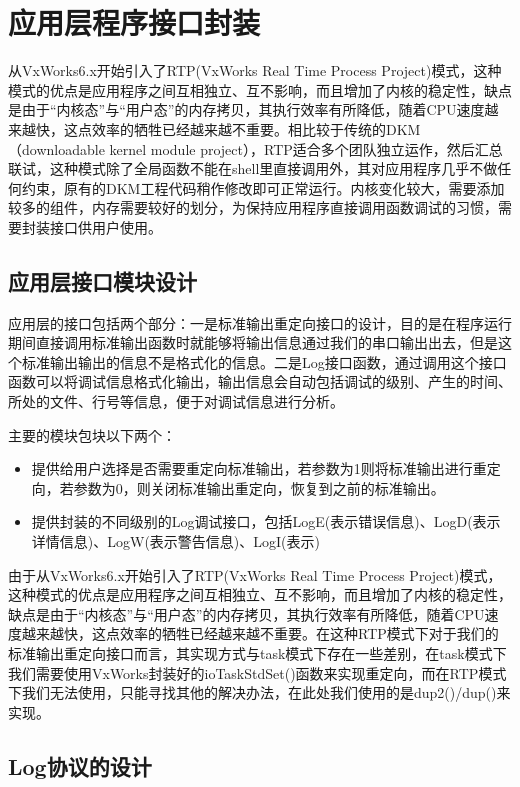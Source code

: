 \chapter{应用层程序接口封装}
	从VxWorks6.x开始引入了RTP(VxWorks Real Time Process Project)模式，这种模式的优点是应用程序之间互相独立、互不影响，而且增加了内核的稳定性，缺点是由于“内核态”与“用户态”的内存拷贝，其执行效率有所降低，随着CPU速度越来越快，这点效率的牺牲已经越来越不重要。相比较于传统的DKM（downloadable kernel module project），RTP适合多个团队独立运作，然后汇总联试，这种模式除了全局函数不能在shell里直接调用外，其对应用程序几乎不做任何约束，原有的DKM工程代码稍作修改即可正常运行。内核变化较大，需要添加较多的组件，内存需要较好的划分，为保持应用程序直接调用函数调试的习惯，需要封装接口供用户使用。

\section{应用层接口模块设计}

	应用层的接口包括两个部分：一是标准输出重定向接口的设计，目的是在程序运行期间直接调用标准输出函数时就能够将输出信息通过我们的串口输出出去，但是这个标准输出输出的信息不是格式化的信息。二是Log接口函数，通过调用这个接口函数可以将调试信息格式化输出，输出信息会自动包括调试的级别、产生的时间、所处的文件、行号等信息，便于对调试信息进行分析。

主要的模块包块以下两个：
\begin{itemize}
\item {} 提供给用户选择是否需要重定向标准输出，若参数为1则将标准输出进行重定向，若参数为0，则关闭标准输出重定向，恢复到之前的标准输出。

\item {} 提供封装的不同级别的Log调试接口，包括LogE(表示错误信息)、LogD(表示详情信息)、LogW(表示警告信息)、LogI(表示)
\end{itemize}

由于从VxWorks6.x开始引入了RTP(VxWorks Real Time Process Project)模式，这种模式的优点是应用程序之间互相独立、互不影响，而且增加了内核的稳定性，缺点是由于“内核态”与“用户态”的内存拷贝，其执行效率有所降低，随着CPU速度越来越快，这点效率的牺牲已经越来越不重要。在这种RTP模式下对于我们的标准输出重定向接口而言，其实现方式与task模式下存在一些差别，在task模式下我们需要使用VxWorks封装好的ioTaskStdSet()函数来实现重定向，而在RTP模式下我们无法使用，只能寻找其他的解决办法，在此处我们使用的是dup2()/dup()来实现。


\section{Log协议的设计}

